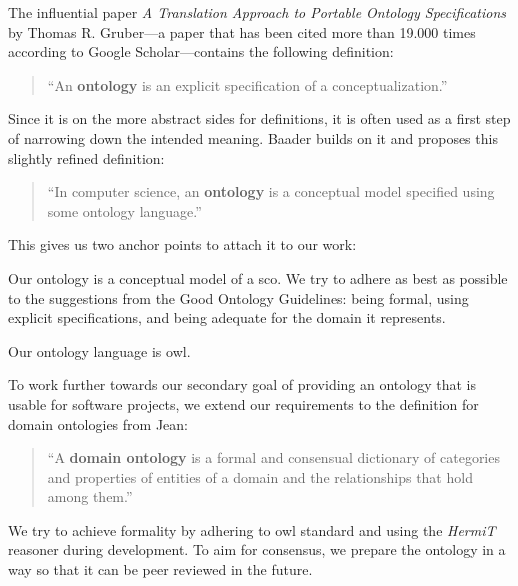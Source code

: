 \documentclass[a4paper, DIV=13, BCOR=0cm]{scrbook}
\begin{document}
The influential paper \cite[p.\,9]{schulz2012guideline} \cite[p.\,4]{loebe2015ontological} \textit{A Translation Approach to Portable Ontology Specifications} by Thomas R. Gruber---a paper that has been cited more than 19.000 times according to Google Scholar---contains the following definition:

\begin{quote}
	\enquote{An \textbf{ontology} is an explicit specification of a conceptualization.} \cite[p.\, 1]{gruber1993translation}
\end{quote}

Since it is on the more abstract sides for definitions, it is often used as a first step of narrowing down the intended meaning. Baader builds on it and proposes this slightly refined definition:

\begin{quote}
	\enquote{In computer science, an \textbf{ontology} is a conceptual model specified using some ontology language.} \cite[p.\,205]{baader2017introduction}
\end{quote}

This gives us two anchor points to attach it to our work:
\begin{inparaenum}
	\item Our ontology is a conceptual model of a \gls{sco}. We try to adhere as best as possible to the suggestions from the Good Ontology Guidelines: being formal, using explicit specifications, and being adequate for the domain it represents. \cite[p.\,10]{schulz2012guideline}
	\item Our ontology language is \gls{owl}.
\end{inparaenum}

To work further towards our secondary goal of providing an ontology that is usable for software projects, we extend our requirements to the definition for domain ontologies from Jean: 

\begin{quote}
	\enquote{A \textbf{domain ontology }is a formal and consensual dictionary of categories and properties of entities of a domain and the relationships that hold among them.} \cite[p.\,240]{Jean_2007}
\end{quote}

We try to achieve formality by adhering to \gls{owl} standard \cite{w3c-owl-guide} and using the \textit{HermiT} reasoner during development. To aim for consensus, we prepare the ontology in a way so that it can be peer reviewed in the future.
\end{document}
